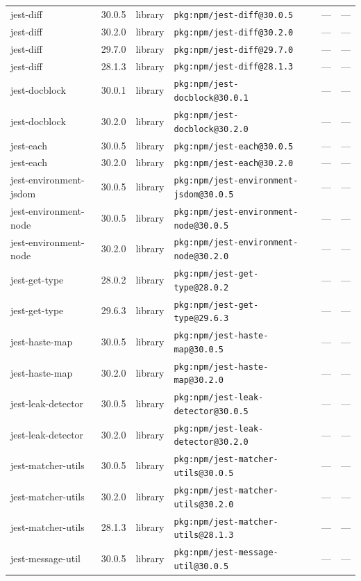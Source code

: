 \documentclass[11pt]{article}
\begin{document}
\begin{longtable}{|l|l|l|p{2.2cm}|l|p{4cm}|}
jest-diff & 30.0.5 & library & \texttt{pkg:npm/jest-diff@30.0.5} & — & — \\
jest-diff & 30.2.0 & library & \texttt{pkg:npm/jest-diff@30.2.0} & — & — \\
jest-diff & 29.7.0 & library & \texttt{pkg:npm/jest-diff@29.7.0} & — & — \\
jest-diff & 28.1.3 & library & \texttt{pkg:npm/jest-diff@28.1.3} & — & — \\
jest-docblock & 30.0.1 & library & \texttt{pkg:npm/jest-docblock@30.0.1} & — & — \\
jest-docblock & 30.2.0 & library & \texttt{pkg:npm/jest-docblock@30.2.0} & — & — \\
jest-each & 30.0.5 & library & \texttt{pkg:npm/jest-each@30.0.5} & — & — \\
jest-each & 30.2.0 & library & \texttt{pkg:npm/jest-each@30.2.0} & — & — \\
jest-environment-jsdom & 30.0.5 & library & \texttt{pkg:npm/jest-environment-jsdom@30.0.5} & — & — \\
jest-environment-node & 30.0.5 & library & \texttt{pkg:npm/jest-environment-node@30.0.5} & — & — \\
jest-environment-node & 30.2.0 & library & \texttt{pkg:npm/jest-environment-node@30.2.0} & — & — \\
jest-get-type & 28.0.2 & library & \texttt{pkg:npm/jest-get-type@28.0.2} & — & — \\
jest-get-type & 29.6.3 & library & \texttt{pkg:npm/jest-get-type@29.6.3} & — & — \\
jest-haste-map & 30.0.5 & library & \texttt{pkg:npm/jest-haste-map@30.0.5} & — & — \\
jest-haste-map & 30.2.0 & library & \texttt{pkg:npm/jest-haste-map@30.2.0} & — & — \\
jest-leak-detector & 30.0.5 & library & \texttt{pkg:npm/jest-leak-detector@30.0.5} & — & — \\
jest-leak-detector & 30.2.0 & library & \texttt{pkg:npm/jest-leak-detector@30.2.0} & — & — \\
jest-matcher-utils & 30.0.5 & library & \texttt{pkg:npm/jest-matcher-utils@30.0.5} & — & — \\
jest-matcher-utils & 30.2.0 & library & \texttt{pkg:npm/jest-matcher-utils@30.2.0} & — & — \\
jest-matcher-utils & 28.1.3 & library & \texttt{pkg:npm/jest-matcher-utils@28.1.3} & — & — \\
jest-message-util & 30.0.5 & library & \texttt{pkg:npm/jest-message-util@30.0.5} & — & — \\

\end{longtable}
\end{document}
